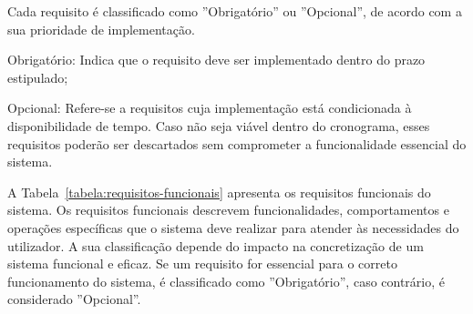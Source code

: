 Cada requisito é classificado como ''Obrigatório'' ou ''Opcional'', de acordo com a sua prioridade de implementação.

\begin{compactitem}
    \item Obrigatório: Indica que o requisito deve ser implementado dentro do prazo estipulado;
    \item Opcional: Refere-se a requisitos cuja implementação está condicionada à disponibilidade de tempo. Caso não seja viável dentro do cronograma, esses requisitos poderão ser descartados sem comprometer a funcionalidade essencial do sistema.
\end{compactitem}

A Tabela~\ref{tabela:requisitos-funcionais} apresenta os requisitos funcionais do sistema. Os requisitos funcionais descrevem funcionalidades, comportamentos e operações específicas que o sistema deve realizar para atender às necessidades do utilizador. A sua classificação depende do impacto na concretização de um sistema funcional e eficaz. Se um requisito for essencial para o correto funcionamento do sistema, é classificado como ''Obrigatório'', caso contrário, é considerado ''Opcional''.


